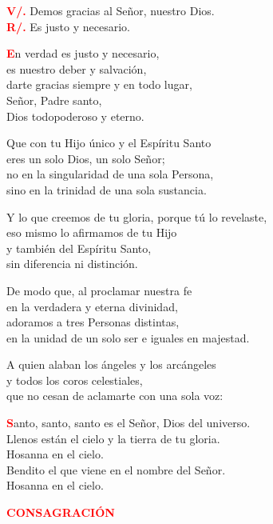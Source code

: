 \documentclass[12pt, letterpaper]{report}
\begin{document}
  \noindent
  \Large {\bfseries \textcolor{red}{V/.}} \hspace{0.5cm} Demos gracias al Se\~nor, nuestro Dios. \\
  \Large {\bfseries \textcolor{red}{R/.}} \hspace{0.5cm} Es justo y necesario.

  \Large \lettrine[lines=2]{\bfseries \textcolor{red}{E}}{}n verdad es justo y necesario,\\
  es nuestro deber y salvaci\'on,\\
  darte gracias siempre y en todo lugar,\\
  Se\~nor, Padre santo,\\
  Dios todopoderoso y eterno.

  Que con tu Hijo \'unico y el Esp\'iritu Santo\\
  eres un solo Dios, un solo Se\~nor;\\
  no en la singularidad de una sola Persona,\\
  sino en la trinidad de una sola sustancia.

  Y lo que creemos de tu gloria, porque t\'u lo revelaste,\\
  eso mismo lo afirmamos de tu Hijo\\
  y tambi\'en del Esp\'iritu Santo,\\
  sin diferencia ni distinci\'on.

  De modo que, al proclamar nuestra fe\\
  en la verdadera y eterna divinidad,\\
  adoramos a tres Personas distintas,\\
  en la unidad de un solo ser e iguales en majestad.

  A quien alaban los \'angeles y los arc\'angeles\\
  y todos los coros celestiales,\\
  que no cesan de aclamarte con una sola voz:
  
  \Large \lettrine[lines=2]{\bfseries \textcolor{red}{S}}{}anto, santo, santo es el Señor, Dios del universo.\\
  Llenos están el cielo y la tierra de tu gloria.\\
  Hosanna en el cielo.\\
  Bendito el que viene en el nombre del Señor.\\
  Hosanna en el cielo.

  \Large {\bfseries \textcolor{red}{CONSAGRACI\'ON}}
\end{document}
